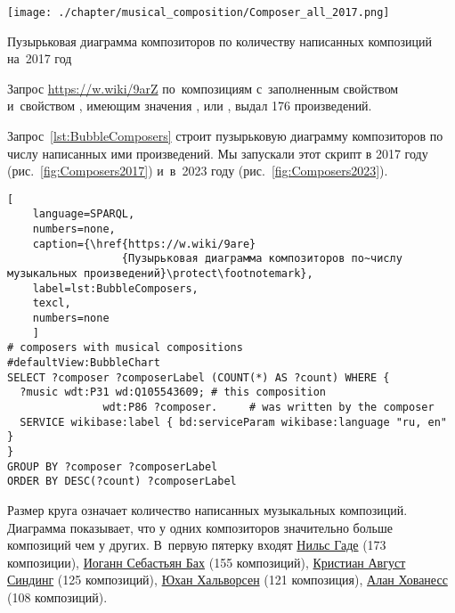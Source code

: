 

\begin{marginfigure}[-0\baselineskip]
  \texttt{[image: ./chapter/musical\_composition/Composer\_all\_2017.png]}
  \vspace{-7pt}
  \caption[Пузырьковая диаграмма композиторов по количеству написанных композиций на~2017 год]{Пузырьковая диаграмма композиторов по количеству написанных композиций на~2017 год}%
  \label{fig:Composers2017}%
\end{marginfigure}

Запрос \href{https://w.wiki/9arZ}{https://w.wiki/9arZ} 
по~композициям с~заполненным свойством  
и~свойством , 
имеющим значения ,  или , 
выдал 176 произведений.


\newpage
Запрос~\ref{lst:BubbleComposers} строит пузырьковую диаграмму композиторов по числу написанных ими произведений.
Мы запускали этот скрипт в 2017 году (рис.~\ref{fig:Composers2017}) 
и~в~2023 году (рис.~\ref{fig:Composers2023}).


\begin{lstlisting}[ 
    language=SPARQL, 
    numbers=none,
    caption={\href{https://w.wiki/9are}
                  {Пузырьковая диаграмма композиторов по~числу музыкальных произведений}\protect\footnotemark},
    label=lst:BubbleComposers,
    texcl,
    numbers=none
    ]
# composers with musical compositions
#defaultView:BubbleChart
SELECT ?composer ?composerLabel (COUNT(*) AS ?count) WHERE {
  ?music wdt:P31 wd:Q105543609; # this composition
               wdt:P86 ?composer.     # was written by the composer
  SERVICE wikibase:label { bd:serviceParam wikibase:language "ru, en" }
}
GROUP BY ?composer ?composerLabel
ORDER BY DESC(?count) ?composerLabel
\end{lstlisting}%

Размер круга означает количество написанных музыкальных композиций. Диаграмма показывает, что у одних композиторов значительно больше композиций чем у других. В~первую пятерку входят \href{https://ru.wikipedia.org/wiki/Гаде,_Нильс}{Нильс Гаде} (\num{173} композиции), \href{https://ru.wikipedia.org/wiki/Бах,_Иоганн_Себастьян}{Иоганн Себастьян Бах} (\num{155} композиций), \href{https://ru.wikipedia.org/wiki/Синдинг,_Кристиан_Август}{Кристиан Август Синдинг} (\num{125} композиций), \href{https://ru.wikipedia.org/wiki/Хальворсен,_Юхан}{Юхан Хальворсен} (\num{121} композиция), \href{https://ru.wikipedia.org/wiki/Хованесс,_Алан}{Алан Хованесс} (\num{108} композиций).

